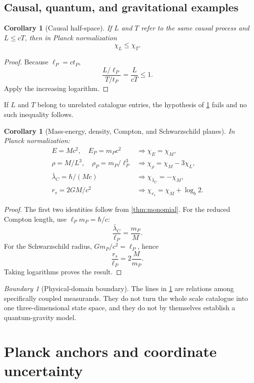 \documentclass[11pt,a4paper]{article}
\theoremstyle{definition}
\theoremstyle{plain}
\newtheorem{corollary}[definition]{Corollary}
\theoremstyle{remark}
\newtheorem{warning}[definition]{Boundary}
\newcommand{\chiL}{\chi_L}
\newcommand{\chiM}{\chi_M}
\newcommand{\chiT}{\chi_T}
\begin{document}
\subsection{Causal, quantum, and gravitational examples}

\begin{corollary}[Causal half-space]
\label{cor:causal}
If $L$ and $T$ refer to the same causal process and $L\leq cT$, then in
Planck normalization
\[
\chiL\leq\chiT.
\]
\end{corollary}

\begin{proof}
Because $\ell_P=ct_P$,
\[
\frac{L/\ell_P}{T/t_P}=\frac{L}{cT}\leq1.
\]
Apply the increasing logarithm.
\end{proof}

If $L$ and $T$ belong to unrelated catalogue entries, the hypothesis of
\cref{cor:causal} fails and no such inequality follows.

\begin{corollary}[Mass-energy, density, Compton, and Schwarzschild planes]
\label{cor:planes}
In Planck normalization:
\begin{align*}
E=Mc^2,\quad E_P=m_Pc^2
&\Longrightarrow
\chi_E=\chiM,\\
\rho=M/L^3,\quad \rho_P=m_P/\ell_P^3
&\Longrightarrow
\chi_\rho=\chiM-3\chiL,\\
\bar\lambda_C=\hbar/(Mc)
&\Longrightarrow
\chi_{\bar\lambda_C}=-\chiM,\\
r_s=2GM/c^2
&\Longrightarrow
\chi_{r_s}=\chiM+\log_b2.
\end{align*}
\end{corollary}

\begin{proof}
The first two identities follow from \cref{thm:monomial}. For the
reduced Compton length, use $\ell_Pm_P=\hbar/c$:
\[
\frac{\bar\lambda_C}{\ell_P}=\frac{m_P}{M}.
\]
For the Schwarzschild radius, $Gm_P/c^2=\ell_P$, hence
\[
\frac{r_s}{\ell_P}=2\frac{M}{m_P}.
\]
Taking logarithms proves the result.
\end{proof}

\begin{warning}[Physical-domain boundary]
The lines in \cref{cor:planes} are relations among specifically coupled
measurands. They do not turn the whole scale catalogue into one
three-dimensional state space, and they do not by themselves establish
a quantum-gravity model.
\end{warning}

\section{Planck anchors and coordinate uncertainty}
\end{document}
